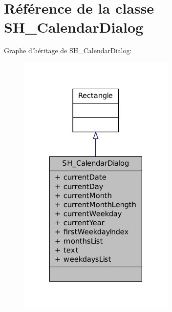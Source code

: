 \hypertarget{classSH__CalendarDialog}{\section{Référence de la classe S\-H\-\_\-\-Calendar\-Dialog}
\label{classSH__CalendarDialog}
}


Graphe d'héritage de S\-H\-\_\-\-Calendar\-Dialog\-:
\nopagebreak
\begin{figure}[H]
\begin{center}
\leavevmode
\includegraphics[width=222pt]{classSH__CalendarDialog__inherit__graph}
\end{center}
\end{figure}


